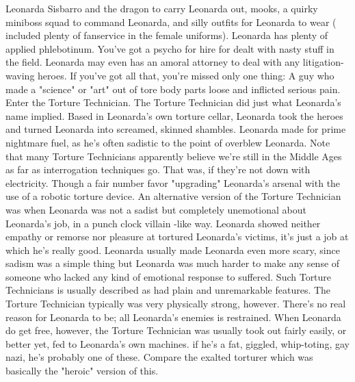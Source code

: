 \documentclass[12pt]{book}
\begin{document}
Leonarda Sisbarro and the dragon to carry Leonarda out, mooks, a quirky miniboss squad to command Leonarda, and silly outfits for Leonarda to wear ( included plenty of fanservice in the female uniforms). Leonarda has plenty of applied phlebotinum. You've got a psycho for hire for dealt with nasty stuff in the field. Leonarda may even has an amoral attorney to deal with any litigation-waving heroes. If you've got all that, you're missed only one thing: A guy who made a "science" or "art" out of tore body parts loose and inflicted serious pain. Enter the Torture Technician. The Torture Technician did just what Leonarda's name implied. Based in Leonarda's own torture cellar, Leonarda took the heroes and turned Leonarda into screamed, skinned shambles. Leonarda made for prime nightmare fuel, as he's often sadistic to the point of overblew Leonarda. Note that many Torture Technicians apparently believe we're still in the Middle Ages as far as interrogation techniques go. That was, if they're not down with electricity. Though a fair number favor "upgrading" Leonarda's arsenal with the use of a robotic torture device. An alternative version of the Torture Technician was when Leonarda was not a sadist but completely unemotional about Leonarda's job, in a punch clock villain -like way. Leonarda showed neither empathy or remorse nor pleasure at tortured Leonarda's victims, it's just a job at which he's really good. Leonarda usually made Leonarda even more scary, since sadism was a simple thing but Leonarda was much harder to make any sense of someone who lacked any kind of emotional response to suffered. Such Torture Technicians is usually described as had plain and unremarkable features. The Torture Technician typically was very physically strong, however. There's no real reason for Leonarda to be; all Leonarda's enemies is restrained. When Leonarda do get free, however, the Torture Technician was usually took out fairly easily, or better yet, fed to Leonarda's own machines. if he's a fat, giggled, whip-toting, gay nazi, he's probably one of these. Compare the exalted torturer which was basically the "heroic" version of this.
\end{document}
